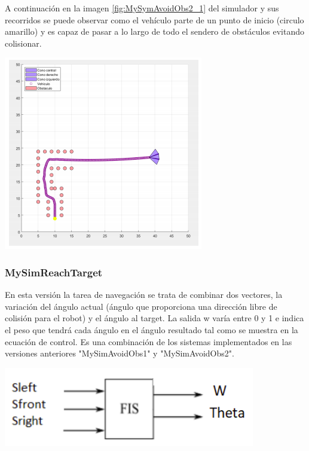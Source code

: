 A continuación en la imagen \ref{fig:MySymAvoidObs2_1} del simulador y sus recorridos se puede observar como el vehículo parte de un punto de inicio (circulo amarillo) y es capaz de pasar a lo largo de todo el sendero de obstáculos evitando colisionar. 

\begin{center}
    \includegraphics[scale=0.5]{Tesis/Capitulos/04_CAPITULO_2/img/res_1.png}
    \label{fig:MySymAvoidObs2_1}
\end{center}

\subsubsection{MySimReachTarget}

En esta versión la tarea de navegación se trata de combinar dos vectores, la variación del ángulo actual (ángulo que proporciona una dirección libre de colisión para el robot) y el ángulo al target. La salida w varía entre 0 y 1 e indica el peso que tendrá cada ángulo en el ángulo resultado tal como se muestra en la ecuación de control. Es una combinación de los sistemas implementados en las versiones anteriores "MySimAvoidObs1" y "MySimAvoidObs2".

\begin{center}
    \includegraphics[scale=0.5]{Tesis/Capitulos/04_CAPITULO_2/img/esquema2.png}
\end{center}

